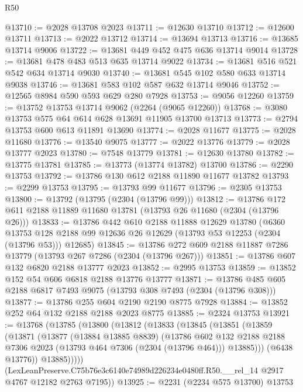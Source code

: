 \begin{lexlean}{R50}
\begin{coremodule}
@13710 := @2028 @13708 @2023
@13711 := @12630 @13710
@13712 := @12600 @13711
@13713 := @2022 @13712
@13714 := @13694 @13713
@13716 := @13685 @13714 @9006
@13722 := @13681 @449 @452 @475 @636 @13714 @9014
@13728 := @13681 @478 @483 @513 @635 @13714 @9022
@13734 := @13681 @516 @521 @542 @634 @13714 @9030
@13740 := @13681 @545 @102 @580 @633 @13714 @9038
@13746 := @13681 @583 @102 @587 @632 @13714 @9046
@13752 := @12565 @8984 @590 @593 @629 @280 @7928
@13753 := @9056 @12260
@13759 := @13752 @13753 @13714 @9062 (@2264 (@9065 @12260))
@13768 := @3080 @13753 @575 @64 @614 @628 @13691 @11905 @13700 @13713
@13773 := @2794 @13753 @600 @613 @11891 @13690
@13774 := @2028 @11677
@13775 := @2028 @11680
@13776 := @13540 @9075
@13777 := @2022 @13776
@13779 := @2028 @13777 @2023
@13780 := @7548 @13779
@13781 := @12630 @13780
@13782 := @13775 @13781
@13785 := @13773 (@13774 @13782) @13700
@13786 := @2290 @13753
@13792 := @13786 @130 @612 @2188 @11890 @11677 @13782
@13793 := @2299 @13753
@13795 := @13793 @99 @11677
@13796 := @2305 @13753
@13800 := @13792 (@13795 (@2304 (@13796 @99)))
@13812 := @13786 @172 @611 @2188 @11889 @11680 @13781 (@13793 @26 @11680 (@2304 (@13796 @26)))
@13833 := @13786
    @442
    @610
    @2188
    @11888
    @12629
    @13780
    (@6360 @13753 @128 @2188 @99 @12636 @26 @12629 (@13793 @53 @12253 (@2304 (@13796 @53))) @12685)
@13845 := @13786 @272 @609 @2188 @11887 @7286 @13779 (@13793 @267 @7286 (@2304 (@13796 @267)))
@13851 := @13786 @607 @132 @6820 @2188 @13777 @2023
@13852 := @2995 @13753
@13859 := @13852 @152 @54 @606 @6818 @2188 @13776 @13777
@13871 := @13786 @485 @605 @2188 @6817 @7493 @9075 (@13793 @308 @7493 (@2304 (@13796 @308)))
@13877 := @13786 @255 @604 @2190 @2190 @8775 @7928
@13884 := @13852 @252 @64 @132 @2188 @2188 @2023 @8775
@13885 := @2324 @13753
@13921 := @13768
    (@13785
      (@13800
        (@13812
          (@13833
            (@13845
              (@13851
                (@13859
                  (@13871
                    (@13877
                      (@13884 @13885 @8839)
                      (@13786
                        @602
                        @132
                        @2188
                        @2188
                        @7306
                        @2023
                        (@13793 @464 @7306 (@2304 (@13796 @464)))
                        @13885)))
                  (@6438 @13776))
                @13885)))))
      (LexLeanPreserve.C75b76e3c6140e74989d226234e0480ff.R50.__rel_14
        @2917
        @4767
        @12182
        @2763
        @7195))
@13925 := @2231 (@2234 @575 @13700) @13753

\end{coremodule}
\end{lexlean}
